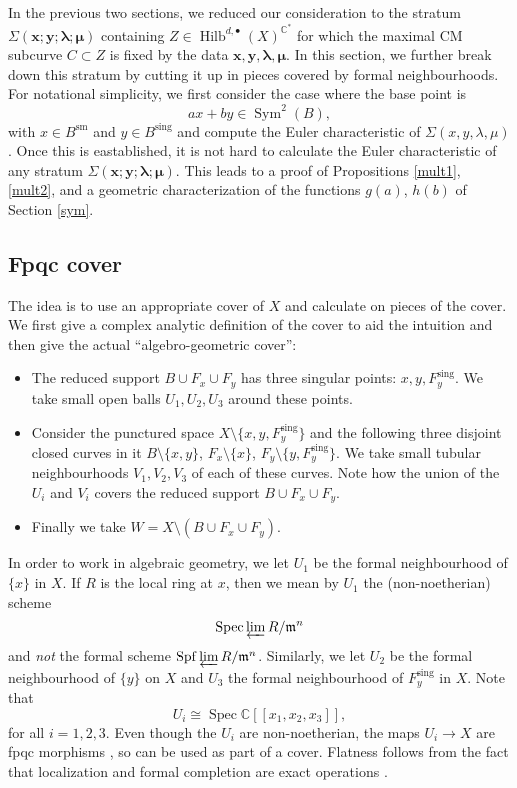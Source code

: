 \documentclass{amsart}
\theoremstyle{definition}
\newcommand{\CC} {\mathbb{C}}          %
\newcommand{\Sym}{\operatorname{Sym}}
\newcommand{\Hilb}{\operatorname{Hilb}}
\newcommand{\Spec}{\operatorname{Spec}}
\newcommand{\sm}{\operatorname{sm}}
\newcommand{\sing}{\operatorname{sing}}
\begin{document}
 In the previous two sections, we reduced our consideration to the stratum $\Sigma(\boldsymbol{x};\boldsymbol{y};\boldsymbol{\lambda};\boldsymbol{\mu})$ containing $Z \in \Hilb^{d,\bullet}(X)^{\CC^*}$ for which the maximal CM subcurve $C \subset Z$ is fixed by the data $\boldsymbol{x}, \boldsymbol{y}, \boldsymbol{\lambda}, \boldsymbol{\mu}$. In this section, we further break down this stratum by cutting it up in pieces covered by formal neighbourhoods. For notational simplicity, we first consider the case where the base point is 
$$
a x + b y \in \Sym^2(B),
$$
with $x \in B^{\sm}$ and $y \in B^{\sing}$ and compute the Euler characteristic of $\Sigma(x,y,\lambda,\mu)$. Once this is eastablished, it is not hard to calculate the Euler characteristic of any stratum  $\Sigma(\boldsymbol{x};\boldsymbol{y};\boldsymbol{\lambda};\boldsymbol{\mu})$. This leads to a proof of Propositions \ref{mult1}, \ref{mult2}, and a geometric characterization of the functions $g(a)$, $h(b)$ of Section \ref{sym}.


\subsection{Fpqc cover}

The idea is to use an appropriate cover of $X$ and calculate on pieces of the cover. We first give a complex analytic definition of the cover to aid the intuition and then give the actual ``algebro-geometric cover'': 
\begin{itemize}
\item The reduced support $B \cup F_x \cup F_y$ has three singular points: $x,y, F_{y}^{\sing}$. We take small open balls $U_1, U_2, U_3$ around these points.
\item Consider the punctured space $X \setminus \{x,y, F_{y}^{\sing}\}$ and the following three disjoint closed curves in it $B \setminus \{x,y\}$, $F_x \setminus \{x\}$, $F_y \setminus \{y,F_{y}^{\sing}\}$. We take small tubular neighbourhoods $V_1, V_2, V_3$ of each of these curves. Note how the union of the $U_i$ and $V_i$ covers the reduced support  $B \cup F_x \cup F_y$.
\item Finally we take $W = X \setminus (B \cup F_x \cup F_y)$. 
\end{itemize}

In order to work in algebraic geometry, we let $U_1$ be the formal neighbourhood of $\{x\}$ in $X$. If $R$ is the local ring at $x$, then we mean by $U_1$ the (non-noetherian) scheme
$$
\Spec \varprojlim R / \mathfrak{m}^n 
$$
and \emph{not} the formal scheme $\mathrm{Spf} \varprojlim R / \mathfrak{m}^n$. Similarly, we let $U_2$ be the formal neighbourhood of $\{y\}$ on $X$ and $U_3$ the formal neighbourhood of $F_{y}^{\sing}$ in $X$. Note that 
$$
U_i \cong\Spec \CC[\![x_1,x_2,x_3]\!],
$$
for all $i=1,2,3$. Even though the $U_i$ are non-noetherian, the maps $U_i \rightarrow X$ are fpqc morphisms \cite{Vis}, so can be used as part of a cover. Flatness follows from the fact that localization and formal completion are exact operations \cite[Cor.~3.6, Prop.~10.12, Prop.~10.13]{AM}. 
\end{document}
